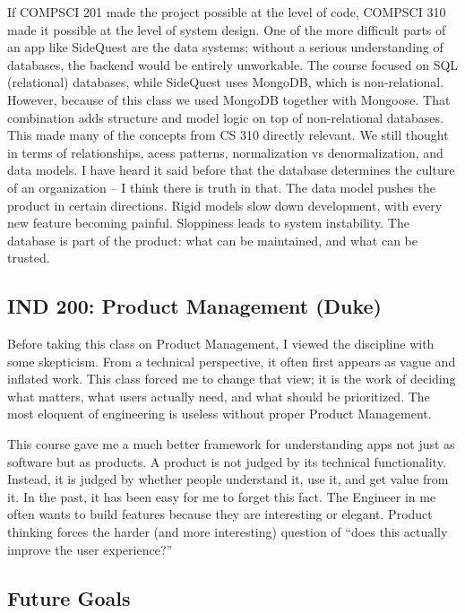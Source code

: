 \documentclass[12pt]{article}
\begin{document}
If COMPSCI 201 made the project possible at the level of code, COMPSCI 310 made it possible at the level of system design. One of the more difficult parts of an app like SideQuest are the data systems; without a serious understanding of databases, the backend would be entirely unworkable. The course focused on SQL (relational) databases, while SideQuest uses MongoDB, which is non-relational. However, because of this class we used MongoDB together with Mongoose. That combination adds structure and model logic on top of non-relational databases. This made many of the concepts from CS 310 directly relevant. We still thought in terms of relationships, acess patterns, normalization vs denormalization, and data models. I have heard it said before that the database determines the culture of an organization – I think there is truth in that. The data model pushes the product in certain directions. Rigid models slow down development, with every new feature becoming painful. Sloppiness leads to system instability. The database is part of the product: what can be maintained, and what can be trusted.

\subsection*{IND 200: Product Management (Duke)}

Before taking this class on Product Management, I viewed the discipline with some skepticism. From a technical perspective, it often first appears as vague and inflated work. This class forced me to change that view; it is the work of deciding what matters, what users actually need, and what should be prioritized. The most eloquent of engineering is useless without proper Product Management.

This course gave me a much better framework for understanding apps not just as software but as products. A product is not judged by its technical functionality. Instead, it is judged by whether people understand it, use it, and get value from it. In the past, it has been easy for me to forget this fact. The Engineer in me often wants to build features because they are interesting or elegant. Product thinking forces the harder (and more interesting) question of “does this actually improve the user experience?” 


\subsection*{Future Goals}
\end{document}
